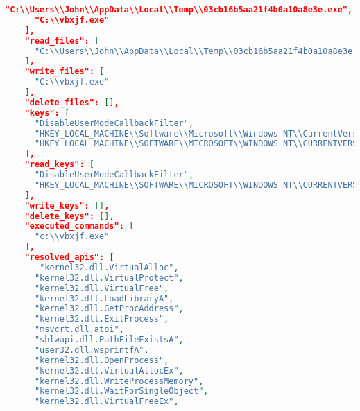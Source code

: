 \begin{lstlisting}[language=json, label=lst:example_report_or, caption=Original report entries]
      "C:\\Users\\John\\AppData\\Local\\Temp\\03cb16b5aa21f4b0a10a8e3e.exe",
      "C:\\vbxjf.exe"
    ],
    "read_files": [
      "C:\\Users\\John\\AppData\\Local\\Temp\\03cb16b5aa21f4b0a10a8e3e.exe"
    ],
    "write_files": [
      "C:\\vbxjf.exe"
    ],
    "delete_files": [],
    "keys": [
      "DisableUserModeCallbackFilter",
      "HKEY_LOCAL_MACHINE\\Software\\Microsoft\\Windows NT\\CurrentVersion\\GRE_Initialize",
      "HKEY_LOCAL_MACHINE\\SOFTWARE\\MICROSOFT\\WINDOWS NT\\CURRENTVERSION\\GRE_Initialize\\DisableMetaFiles"
    ],
    "read_keys": [
      "DisableUserModeCallbackFilter",
      "HKEY_LOCAL_MACHINE\\SOFTWARE\\MICROSOFT\\WINDOWS NT\\CURRENTVERSION\\GRE_Initialize\\DisableMetaFiles"
    ],
    "write_keys": [],
    "delete_keys": [],
    "executed_commands": [
      "c:\\vbxjf.exe"
    ],
    "resolved_apis": [
       "kernel32.dll.VirtualAlloc",
      "kernel32.dll.VirtualProtect",
      "kernel32.dll.VirtualFree",
      "kernel32.dll.LoadLibraryA",
      "kernel32.dll.GetProcAddress",
      "kernel32.dll.ExitProcess",
      "msvcrt.dll.atoi",
      "shlwapi.dll.PathFileExistsA",
      "user32.dll.wsprintfA",
      "kernel32.dll.OpenProcess",
      "kernel32.dll.VirtualAllocEx",
      "kernel32.dll.WriteProcessMemory",
      "kernel32.dll.WaitForSingleObject",
      "kernel32.dll.VirtualFreeEx",

\end{lstlisting}
